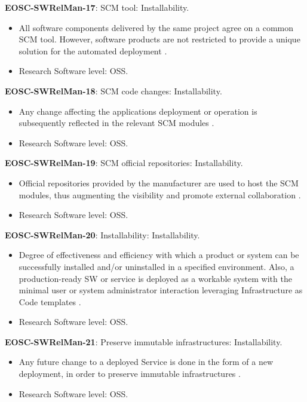 \textbf{EOSC-SWRelMan-17}: SCM tool: Installability.

\begin{itemize}
    \item All software components delivered by the same project agree on a common SCM tool. However, software products are not restricted to provide a unique solution for the automated deployment \cite{orviz_set_2017}.
    \item Research Software level: OSS.
\end{itemize}

\textbf{EOSC-SWRelMan-18}: SCM code changes: Installability.

\begin{itemize}
    \item Any change affecting the applications deployment or operation is subsequently reflected in the relevant SCM modules \cite{orviz_set_2017}.
    \item Research Software level: OSS.
\end{itemize}

\textbf{EOSC-SWRelMan-19}: SCM official repositories: Installability.

\begin{itemize}
    \item Official repositories provided by the manufacturer are used to host the SCM modules, thus augmenting the visibility and promote external collaboration \cite{orviz_set_2017}.
    \item Research Software level: OSS.
\end{itemize}

\textbf{EOSC-SWRelMan-20}: Installability: Installability.

\begin{itemize}
    \item Degree of effectiveness and efficiency with which a product or system can be successfully installed and/or uninstalled in a specified environment. Also, a production-ready SW or service is deployed as a workable system with the minimal user or system administrator interaction leveraging Infrastructure as Code templates \cite{iso_25010_2011_2017,orviz_fernandez_eosc-synergy_2020}.
    \item Research Software level: OSS.
\end{itemize}

\textbf{EOSC-SWRelMan-21}: Preserve immutable infrastructures: Installability.

\begin{itemize}
    \item Any future change to a deployed Service is done in the form of a new deployment, in order to preserve immutable infrastructures \cite{orviz_fernandez_eosc-synergy_2020}.
    \item Research Software level: OSS.
\end{itemize}


